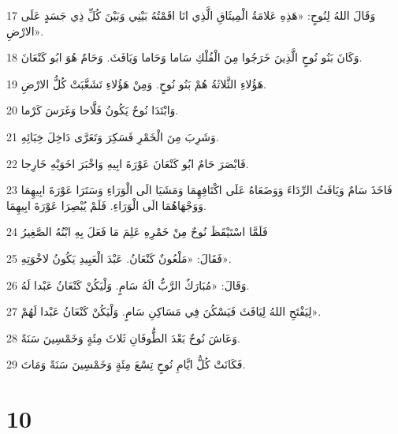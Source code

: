 \par 17 وَقَالَ اللهُ لِنُوحٍ: «هَذِهِ عَلامَةُ الْمِيثَاقِ الَّذِي انَا اقَمْتُهُ بَيْنِي وَبَيْنَ كُلِّ ذِي جَسَدٍ عَلَى الارْضِ».
\par 18 وَكَانَ بَنُو نُوحٍ الَّذِينَ خَرَجُوا مِنَ الْفُلْكِ سَاما وَحَاما وَيَافَثَ. وَحَامٌ هُوَ ابُو كَنْعَانَ.
\par 19 هَؤُلاءِ الثَّلاثَةُ هُمْ بَنُو نُوحٍ. وَمِنْ هَؤُلاءِ تَشَعَّبَتْ كُلُّ الارْضِ.
\par 20 وَابْتَدَا نُوحٌ يَكُونُ فَلَّاحا وَغَرَسَ كَرْما.
\par 21 وَشَرِبَ مِنَ الْخَمْرِ فَسَكِرَ وَتَعَرَّى دَاخِلَ خِبَائِهِ.
\par 22 فَابْصَرَ حَامٌ ابُو كَنْعَانَ عَوْرَةَ ابِيهِ وَاخْبَرَ اخَوَيْهِ خَارِجا.
\par 23 فَاخَذَ سَامٌ وَيَافَثُ الرِّدَاءَ وَوَضَعَاهُ عَلَى اكْتَافِهِمَا وَمَشَيَا الَى الْوَرَاءِ وَسَتَرَا عَوْرَةَ ابِيهِمَا وَوَجْهَاهُمَا الَى الْوَرَاءِ. فَلَمْ يُبْصِرَا عَوْرَةَ ابِيهِمَا.
\par 24 فَلَمَّا اسْتَيْقَظَ نُوحٌ مِنْ خَمْرِهِ عَلِمَ مَا فَعَلَ بِهِ ابْنُهُ الصَّغِيرُ
\par 25 فَقَالَ: «مَلْعُونٌ كَنْعَانُ. عَبْدَ الْعَبِيدِ يَكُونُ لاخْوَتِهِ».
\par 26 وَقَالَ: «مُبَارَكٌ الرَّبُّ الَهُ سَامٍ. وَلْيَكُنْ كَنْعَانُ عَبْدا لَهُ.
\par 27 لِيَفْتَحِ اللهُ لِيَافَثَ فَيَسْكُنَ فِي مَسَاكِنِ سَامٍ. وَلْيَكُنْ كَنْعَانُ عَبْدا لَهُمْ».
\par 28 وَعَاشَ نُوحٌ بَعْدَ الطُّوفَانِ ثَلاثَ مِئَةٍ وَخَمْسِينَ سَنَةً.
\par 29 فَكَانَتْ كُلُّ ايَّامِ نُوحٍ تِسْعَ مِئَةٍ وَخَمْسِينَ سَنَةً وَمَاتَ.

\chapter{10}

